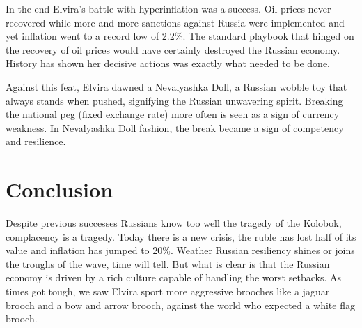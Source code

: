 \documentclass[12pt]{article}
\begin{document}
In the end Elvira’s battle with hyperinflation was a success. Oil prices never recovered while more and more sanctions against Russia were implemented and yet inflation went to a record low of 2.2\%. The standard playbook that hinged on the recovery of oil prices would have certainly destroyed the Russian economy. History has shown her decisive actions was exactly what needed to be done.

Against this feat, Elvira dawned a Nevalyashka Doll, a Russian wobble toy that always stands when pushed, signifying the Russian unwavering spirit. Breaking the national peg (fixed exchange rate) more often is seen as a sign of currency weakness. In Nevalyashka Doll fashion, the break became a sign of competency and resilience.  



\section{Conclusion 
\label{sec:Conclusion}}

Despite previous successes Russians know too well the tragedy of the Kolobok, complacency is a tragedy. Today there is a new crisis, the ruble has lost half of its value and inflation has jumped to 20\%. Weather Russian resiliency shines or joins the troughs of the wave, time will tell. But what is clear is that the Russian economy is driven by a rich culture capable of handling the worst setbacks. As times got tough, we saw Elvira sport more aggressive brooches like a jaguar brooch and a bow and arrow brooch, against the world who expected a white flag brooch. 










\clearpage
\begin{singlespace}
%
%


\end{singlespace}


\newpage
\appendix
\setcounter{table}{0}
\renewcommand{\tablename}{Appendix Table}
\renewcommand{\figurename}{Appendix Figure}
\renewcommand{\thetable}{A\arabic{table}}
\setcounter{figure}{0}
\renewcommand{\thefigure}{A\arabic{figure}}
\end{document}
